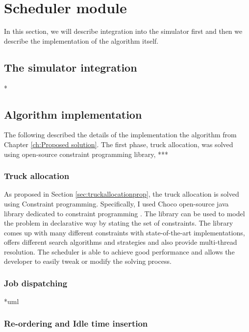\documentclass{ctuthesis}
\begin{document}
\section{Scheduler module}

In this section, we will describe integration into the simulator first and then we describe the implementation of the algorithm itself.

\subsection{The simulator integration}

*

\subsection{Algorithm implementation}

The following described the details of the implementation the algorithm from Chapter \ref{ch:Proposed solution}. The first phase, truck allocation, was solved using open-source constraint programming library, ***

\subsubsection{Truck allocation}

As proposed in Section \ref{sec:truckallocationprop}, the truck allocation is solved using Constraint programming. Specifically, I used Choco open-source java library dedicated to constraint programming \cite{choco}. The library can be used to model the problem in declarative way by stating the set of constraints. The library comes up with many different constraints with state-of-the-art implementations, offers different search algorithms and strategies and also provide multi-thread resolution. The scheduler is able to achieve good performance and allows the developer to easily tweak or modify the solving process.

\subsubsection{Job dispatching}

*uml

\subsubsection{Re-ordering and Idle time insertion}
\end{document}
